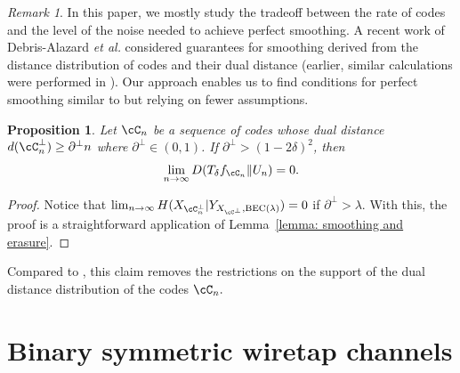 \documentclass{amsart}
\newtheorem{proposition}[theorem]{Proposition}
\theoremstyle{remark}
\newtheorem{remark}{Remark}
\begin{document}
\begin{remark} In this paper, we mostly study the tradeoff between the rate of codes and the level of the noise needed
to achieve perfect smoothing. A recent work of Debris-Alazard \emph{et al.} \cite{debris2023smoothing} considered
guarantees for smoothing derived from the distance distribution of codes and their dual distance (earlier, similar
calculations were performed in \cite{barg2021stolarsky,ashikhmin2002bounds}). Our approach enables us to 
find conditions for perfect smoothing similar to \cite{debris2023smoothing} but relying on fewer assumptions.
\begin{proposition}\label{prop: sm and dual_dist}
Let $\cC_n$ be a sequence of codes whose dual distance $d(\cC_n^\bot) \geq \partial^\bot n$ where $\partial^\bot \in (0,1)$. If $\partial^\bot > (1-2\delta)^2$, then
    \begin{align*}
        \lim_{n \to \infty} D(T_{\delta}f_{\cC_n}\|U_n) = 0.
    \end{align*}
\end{proposition}
%
\begin{proof}
    Notice that $\lim_{n \to \infty} H(X_{\cC_n^{\bot}}|Y_{X_{\cC^{\bot}},{\text{\rm BEC}}(\lambda)}) = 0$ if $\partial^\bot > \lambda$. With this, the proof is a straightforward application of Lemma~\ref{lemma: smoothing and erasure}. 
\end{proof}
\end{remark}
Compared to \cite{debris2023smoothing}, this claim removes the restrictions on the support of the dual distance distribution of the codes $\cC_n.$

\section{Binary symmetric wiretap channels }\label{sec: binary symmetric wiretap channel}
\end{document}
